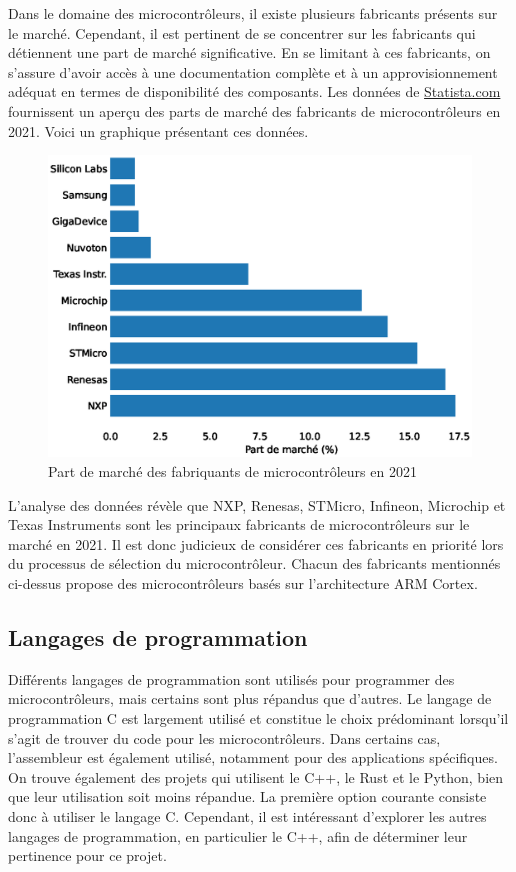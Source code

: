 Dans le domaine des microcontrôleurs, il existe plusieurs fabricants présents sur le marché.
Cependant, il est pertinent de se concentrer sur les fabricants qui détiennent une part de marché significative.
En se limitant à ces fabricants, on s'assure d'avoir accès à une documentation complète et à un approvisionnement adéquat en termes de disponibilité des composants.
Les données de \href{https://www.statista.com/statistics/1327509/top-mcu-suppliers-worldwide/}{Statista.com} fournissent un aperçu des parts de marché des fabricants de microcontrôleurs en 2021.
Voici un graphique présentant ces données.

\begin{figure}[H]
    \centering
    \includegraphics[width=12cm]{./assets/figures/topmcu.py.eps}
    \caption{Part de marché des fabriquants de microcontrôleurs en 2021 }
    \label{fig:topmcu}
\end{figure}

L'analyse des données révèle que NXP, Renesas, STMicro, Infineon, Microchip et Texas Instruments sont les principaux fabricants de microcontrôleurs sur le marché en 2021.
Il est donc judicieux de considérer ces fabricants en priorité lors du processus de sélection du microcontrôleur.
Chacun des fabricants mentionnés ci-dessus propose des microcontrôleurs basés sur l'architecture ARM Cortex.

\subsection{Langages de programmation}

Différents langages de programmation sont utilisés pour programmer des microcontrôleurs, mais certains sont plus répandus que d'autres.
Le langage de programmation C est largement utilisé et constitue le choix prédominant lorsqu'il s'agit de trouver du code pour les microcontrôleurs.
Dans certains cas, l'assembleur est également utilisé, notamment pour des applications spécifiques.
On trouve également des projets qui utilisent le C++, le Rust et le Python, bien que leur utilisation soit moins répandue.
La première option courante consiste donc à utiliser le langage C.
Cependant, il est intéressant d'explorer les autres langages de programmation, en particulier le C++, afin de déterminer leur pertinence pour ce projet.

